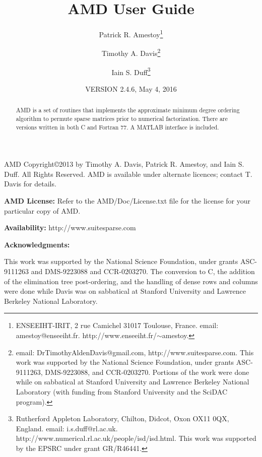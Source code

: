 \documentclass[11pt]{article}
\begin{document}

\title{AMD User Guide}
\author{Patrick R. Amestoy\thanks{ENSEEIHT-IRIT,
2 rue Camichel 31017 Toulouse, France.
email: amestoy@enseeiht.fr.  http://www.enseeiht.fr/$\sim$amestoy.}
\and Timothy A. Davis\thanks{
email: DrTimothyAldenDavis@gmail.com,
http://www.suitesparse.com.
This work was supported by the National
Science Foundation, under grants ASC-9111263, DMS-9223088, and CCR-0203270.
Portions of the work were done while on sabbatical at Stanford University
and Lawrence Berkeley National Laboratory (with funding from Stanford
University and the SciDAC program).
}
\and Iain S. Duff\thanks{Rutherford Appleton Laboratory, Chilton, Didcot, 
Oxon OX11 0QX, England. email: i.s.duff@rl.ac.uk.  
http://www.numerical.rl.ac.uk/people/isd/isd.html.
This work was supported by the EPSRC under grant GR/R46441.
}}

\date{VERSION 2.4.6, May 4, 2016}
\maketitle

\begin{abstract}
AMD is a set of routines that implements the approximate minimum degree ordering
algorithm to permute sparse matrices prior to
numerical factorization.
There are versions written in both C and Fortran 77.
A MATLAB interface is included.
\end{abstract}

AMD Copyright\copyright 2013 by Timothy A.
Davis, Patrick R. Amestoy, and Iain S. Duff.  All Rights Reserved.
AMD is available under alternate licences; contact T. Davis for details.

{\bf AMD License:} Refer to the AMD/Doc/License.txt file for the license
for your particular copy of AMD.

{\bf Availability:}
    http://www.suitesparse.com

{\bf Acknowledgments:}

    This work was supported by the National Science Foundation, under
    grants ASC-9111263 and DMS-9223088 and CCR-0203270.
    The conversion to C, the addition of the elimination tree
    post-ordering, and the handling of dense rows and columns
    were done while Davis was on sabbatical at
    Stanford University and Lawrence Berkeley National Laboratory.
\end{document}
